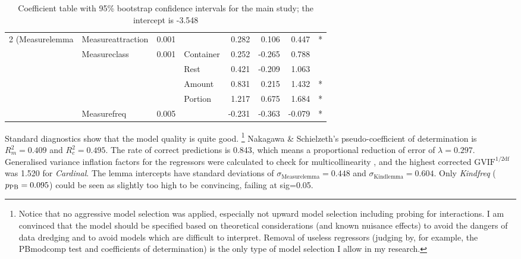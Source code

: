 \begin{table}
{\begin{tabular}{llrlrrrc}
    2 (Measurelemma & Measureattraction &  0.001                 &              &  0.282      &  0.106 &  0.447  & *             \\
                    & Measureclass      &  0.001                 & Container    &  0.252      & -0.265 &  0.788  &               \\
                    &                   &                        & Rest         &  0.421      & -0.209 &  1.063  &               \\
                    &                   &                        & Amount       &  0.831      &  0.215 &  1.432  & *             \\
                    &                   &                        & Portion      &  1.217      &  0.675 &  1.684  & *             \\
                    & Measurefreq       &  0.005                 &              & -0.231      & -0.363 & -0.079  & *             \\

  \end{tabular}
  }
  \caption{Coefficient table with 95\% bootstrap confidence intervals for the main study; the intercept is -3.548}
  \label{tab:bigtable}
\end{table}

Standard diagnostics show that the model quality is quite good.%
\footnote{Notice that no aggressive model selection was applied, especially not upward model selection including probing for interactions.
I am convinced that the model should be specified based on theoretical considerations (and known nuisance effects) to avoid the dangers of data dredging and to avoid models which are difficult to interpret.
Removal of useless regressors (judging by, for example, the PBmodcomp test and coefficients of determination) is the only type of model selection I allow in my research.}
Nakagawa \& Schielzeth's pseudo-coefficient of determination is $R_m^2=0.409$ and $R^2_c=0.495$.
The rate of correct predictions is 0.843, which means a proportional reduction of error of $\lambda=0.297$.
Generalised variance inflation factors for the regressors were calculated to check for multicollinearity \citep{FoxMonette1992,ZuurEa2010}, and the highest corrected $\text{GVIF}^{1/2\text{df}}$ was 1.520 for \textit{Cardinal}.
The lemma intercepts have standard deviations of $\sigma_{\text{Measurelemma}}=0.448$ and $\sigma_{\text{Kindlemma}}=0.604$.
Only \textit{Kindfreq} ($p_{\text{PB}}=0.095$) could be seen as slightly too high to be convincing, failing at sig=0.05.

